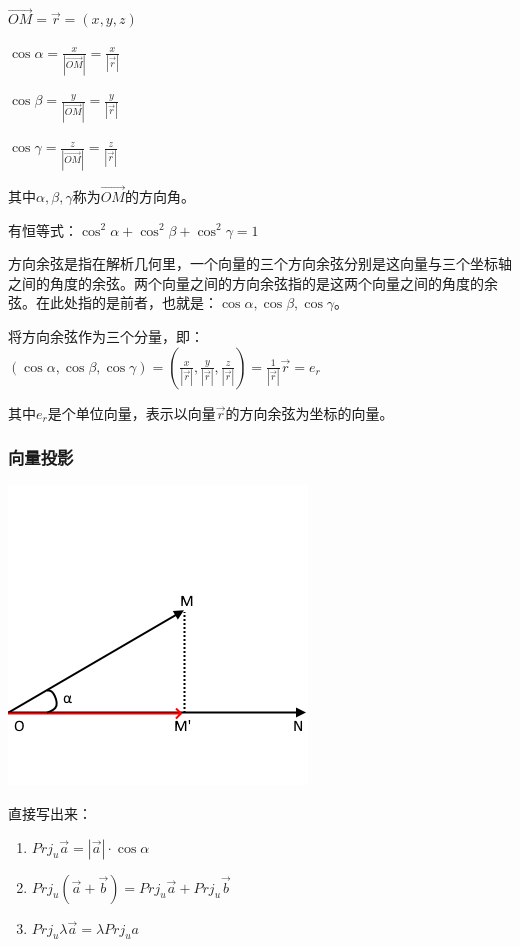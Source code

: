 \documentclass[UTF8]{ctexbook}
\newcommand{\projection}[1]{Prj_{#1}}
\begin{document}
{{{{      $\vec{OM} = \vec{r} = (x,y,z)$

      $\cos\alpha = \frac{x}{|\vec{OM}|} = \frac{x}{|\vec{r}|}$

      $\cos\beta = \frac{y}{|\vec{OM}|} = \frac{y}{|\vec{r}|}$

      $\cos\gamma = \frac{z}{|\vec{OM}|} = \frac{z}{|\vec{r}|}$

      其中$\alpha,\beta,\gamma$称为$\vec{OM}$的方向角。

      有恒等式：$\cos^2\alpha + \cos^2\beta + \cos^2\gamma = 1$

      方向余弦是指在解析几何里，一个向量的三个方向余弦分别是这向量与三个坐标轴之间的角度的余弦。两个向量之间的方向余弦指的是这两个向量之间的角度的余弦。在此处指的是前者，也就是：$\cos\alpha,\cos\beta,\cos\gamma$。

      将方向余弦作为三个分量，即：$(\cos\alpha,\cos\beta,\cos\gamma) = (\frac{x}{|\vec{r}|}, \frac{y}{|\vec{r}|}, \frac{z}{|\vec{r}|}) = \frac{1}{|\vec{r}|}\vec{r} = e_r$

      其中$e_r$是个单位向量，表示以向量$\vec{r}$的方向余弦为坐标的向量。

    }%

    \subsubsection{向量投影}{
      \includegraphics{resources/vector_axis_projection.png}

      直接写出来：
      \begin{enumerate}
        \item $\projection{u}\vec{a} = |\vec{a}|\cdot\cos\alpha$
        \item $\projection{u}(\vec{a} + \vec{b}) = \projection{u}\vec{a} + \projection{u}\vec{b}$
        \item $\projection{u}\lambda\vec{a} = \lambda\projection{u}a$
      \end{enumerate}

}}}}
\end{document}
